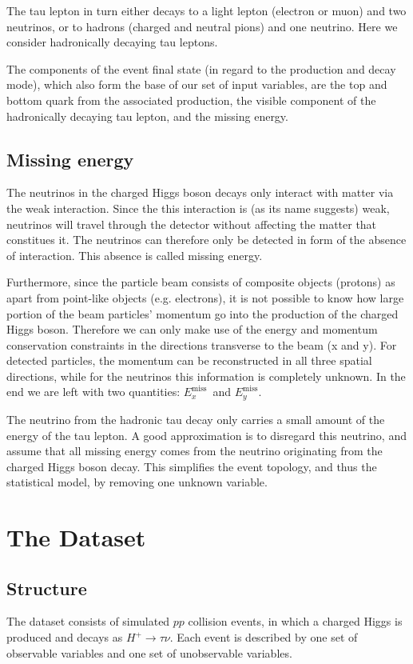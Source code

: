 \documentclass{scrartcl}
\newcommand{\exmiss}{$E_x^\text{miss}$}
\newcommand{\eymiss}{$E_y^\text{miss}$}
\begin{document}
The tau lepton in turn either decays to a light lepton (electron or muon) and two neutrinos, or to hadrons (charged and neutral pions) and one neutrino. Here we consider hadronically decaying tau leptons.

The components of the event final state (in regard to the production and decay mode), which also form the base of our set of input variables, are the top and bottom quark from the associated production, the visible component of the hadronically decaying tau lepton, and the missing energy.

\subsection{Missing energy}
The neutrinos in the charged Higgs boson decays only interact with matter via the weak interaction. Since the this interaction is (as its name suggests) weak, neutrinos will travel through the detector without affecting the matter that constitues it. The neutrinos can therefore only be detected in form of the absence of interaction. This absence is called missing energy.

Furthermore, since the particle beam consists of composite objects (protons) as apart from point-like objects (e.g. electrons), it is not possible to know how large portion of the beam particles' momentum go into the production of the charged Higgs boson. Therefore we can only make use of the energy and momentum conservation constraints in the directions transverse to the beam (x and y). For detected particles, the momentum can be reconstructed in all three spatial directions, while for the neutrinos this information is completely unknown. In the end we are left with two quantities: \exmiss\ and \eymiss.

The neutrino from the hadronic tau decay only carries a small amount of the energy of the tau lepton. A good approximation is to disregard this neutrino, and assume that all missing energy comes from the neutrino originating from the charged Higgs boson decay. This simplifies the event topology, and thus the statistical model, by removing one unknown variable.

\section{The Dataset}
\subsection{Structure}
The dataset consists of simulated $pp$ collision events, in which a charged Higgs is produced and decays as $H^+\to\tau\nu$. Each event is described by one set of observable variables and one set of unobservable variables.
\end{document}
